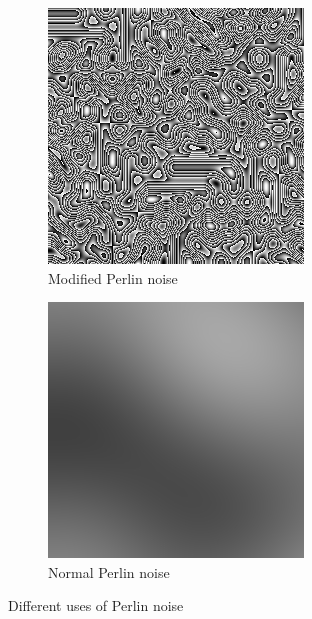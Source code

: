 		\begin{figure}[h]
			\begin{subfigure}{0.5\textwidth}
				\centering
				\includegraphics[width=0.9\linewidth]{"Images/floor perlin"}
				\caption[Floored Perlin noise]{Modified Perlin noise}
				\label{fig:modified-perlin}
			\end{subfigure}
			\begin{subfigure}{0.5\textwidth}
				\centering
				\includegraphics[width=0.9\linewidth]{"Images/normal perlin"}
				\caption[Normal Perlin noise]{Normal Perlin noise}
				\label{fig:normal-perlin}
			\end{subfigure}
			\caption{Different uses of Perlin noise}
			\label{fig:normal-and-modified-perlin}
		\end{figure}
		
